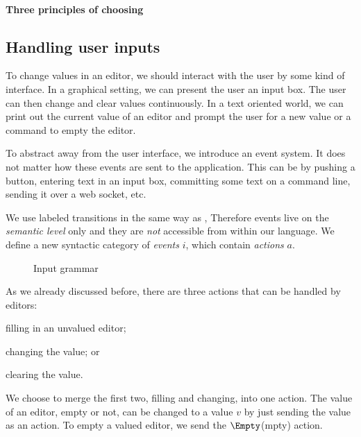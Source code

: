 \paragraph{Three principles of choosing}
\label{sec:choosing-principles}





\subsection{Handling user inputs}
\label{sec:handling}

To change values in an editor,
we should interact with the user by some kind of interface.
In a graphical setting,
we can present the user an input box.
The user can then change and clear values continuously.
In a text oriented world,
we can print out the current value of an editor
and prompt the user for a new value
or a command to empty the editor.

To abstract away from the user interface,
we introduce an event system.
It does not matter how these events are sent to the application.
This can be by pushing a button,
entering text in an input box,
committing some text on a command line,
sending it over a web socket,
etc.

%
We use labeled transitions in the same way as \textcite{school/maktoberdorf/PeytonJones01},
Therefore events live on the \emph{semantic level} only
and they are \emph{not} accessible from within our language.
We define a new syntactic category of \emph{events} $i$,
which contain \emph{actions} $a$.

\begin{figure}[h]
  \small
  \caption{Input grammar} \label{fig:input-grammar}
\end{figure}

As we already discussed before,
there are three actions that can be handled by editors:
\begin{enumerate*}
  \item filling in an unvalued editor;
  \item changing the value; or
  \item clearing the value.
\end{enumerate*}
We choose to merge the first two, filling and changing, into one action.
The value of an editor, empty or not, can be changed to a value $v$ by just sending the value as an action.
To empty a valued editor, we send the $\Empty$(mpty) action.

